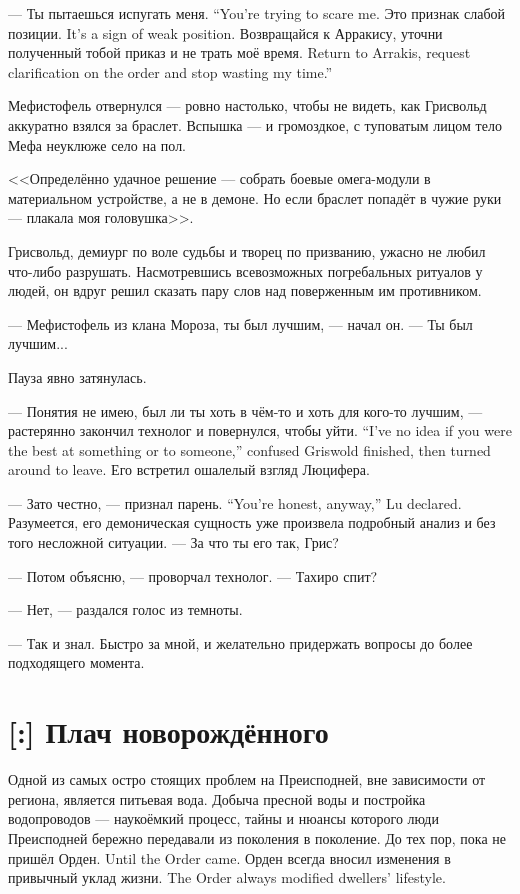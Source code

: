 {--- Ты пытаешься испугать меня.}
{``You're trying to scare me.}
{Это признак слабой позиции.}
{It's a sign of weak position.}
{Возвращайся к Арракису, уточни полученный тобой приказ и не трать моё время.}
{Return to Arrakis, request clarification on the order and stop wasting my time.''}

Мефистофель отвернулся --- ровно настолько, чтобы не видеть, как Грисвольд аккуратно взялся за браслет.
Вспышка --- и громоздкое, с туповатым лицом тело Мефа неуклюже село на пол.

<<Определённо удачное решение --- собрать боевые омега-модули в материальном устройстве, а не в демоне.
Но если браслет попадёт в чужие руки --- плакала моя головушка>>.

Грисвольд, демиург по воле судьбы и творец по призванию, ужасно не любил что-либо разрушать.
Насмотревшись всевозможных погребальных ритуалов у людей, он вдруг решил сказать пару слов над поверженным им противником.

--- Мефистофель из клана Мороза, ты был лучшим, --- начал он.
--- Ты был лучшим...

Пауза явно затянулась.

{--- Понятия не имею, был ли ты хоть в чём-то и хоть для кого-то лучшим, --- растерянно закончил технолог и повернулся, чтобы уйти.}
{``I've no idea if you were the best at something or to someone,'' confused Griswold finished, then turned around to leave.}
Его встретил ошалелый взгляд Люцифера.

{--- Зато честно, --- признал парень.}
{``You're honest, anyway,'' Lu declared.}
Разумеется, его демоническая сущность уже произвела подробный анализ и без того несложной ситуации.
--- За что ты его так, Грис?

--- Потом объясню, --- проворчал технолог.
--- Тахиро спит?

--- Нет, --- раздался голос из темноты.

--- Так и знал.
Быстро за мной, и желательно придержать вопросы до более подходящего момента.

\section{[:] Плач новорождённого}

Одной из самых остро стоящих проблем на Преисподней, вне зависимости от региона, является питьевая вода.
Добыча пресной воды и постройка водопроводов --- наукоёмкий процесс, тайны и нюансы которого люди Преисподней бережно передавали из поколения в поколение.
{До тех пор, пока не пришёл Орден.}
{Until the Order came.}
{Орден всегда вносил изменения в привычный уклад жизни.}
{The Order always modified dwellers' lifestyle.}

